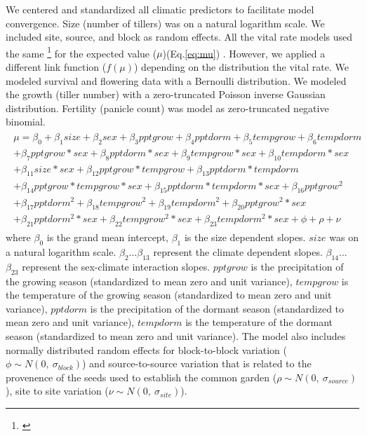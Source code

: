 \documentclass[12pt]{article}\usepackage[]{graphicx}\usepackage[dvipsnames]{xcolor}
\newcommand{\tom}[2]{{\color{red}{#1}}\footnote{\textit{\color{red}{#2}}}}
\begin{document}
We centered and standardized all climatic predictors to facilitate model convergence.
Size (number of tillers) was on a natural logarithm scale. 
We included site, source, and block as random effects.
All the vital rate models used the same \tom{linear predictor}{It is still a ``linear predictor'' even if it has quadratic terms.} for the expected value ($\mu$)(Eq.\ref{eq:mu}) . 
However, we applied a different link function ($f(\mu)$) depending on the distribution the vital rate. 
We modeled survival and flowering data with a Bernoulli distribution.
We modeled the growth (tiller number) with a zero-truncated Poisson inverse Gaussian distribution. 
Fertility (panicle count) was model as zero-truncated negative binomial. 
\begin{align}\label{eq:mu}
\begin{split}
\mu = \beta_{0} + \beta_{1}size + \beta_{2}sex + \beta_{3}pptgrow + \beta_{4}pptdorm + \beta_{5}tempgrow + \beta_{6}tempdorm \\ 
+ \beta_{7}pptgrow*sex + \beta_{8}pptdorm*sex + \beta_{9}tempgrow*sex + \beta_{10}tempdorm*sex  \\ 
+  \beta_{11}size*sex + \beta_{12}pptgrow*tempgrow + \beta_{13}pptdorm*tempdorm\\
+ \beta_{14}pptgrow*tempgrow*sex + \beta_{15}pptdorm*tempdorm*sex + \beta_{16}pptgrow^2\\
+ \beta_{17}pptdorm^2 + \beta_{18}tempgrow^2 + \beta_{19}tempdorm^2 + \beta_{20}pptgrow^2*sex  \\
+ \beta_{21}pptdorm^2*sex + \beta_{22}tempgrow^2*sex + \beta_{23}tempdorm^2*sex + \phi + \rho + \nu 
\end{split}
\end{align}
\noindent where $\beta_{0}$ is the  grand mean intercept, $\beta_{1}$ is the size dependent slopes.
$size$ was on a natural logarithm scale. 
$\beta_{2}$...$\beta_{13}$ represent the climate dependent slopes.
$\beta_{14}$...$\beta_{23}$ represent the sex-climate interaction slopes.
$pptgrow$ is the precipitation of the growing season (standardized to mean zero and unit variance), $tempgrow$ is the temperature of the growing season (standardized to mean zero and unit variance), $pptdorm$ is the precipitation of the dormant season (standardized to mean zero and unit variance), $tempdorm$ is the temperature of the dormant season (standardized to mean zero and unit variance).
The model also includes normally distributed random effects for block-to-block variation ($\phi \sim N(0,\ \sigma_{block})$) and source-to-source variation that is related to the provenence of the seeds used to establish the common garden ($\rho \sim N(0,\ \sigma_{source})$), site to site variation ($\nu \sim N(0,\ \sigma_{site})$).
\end{document}
